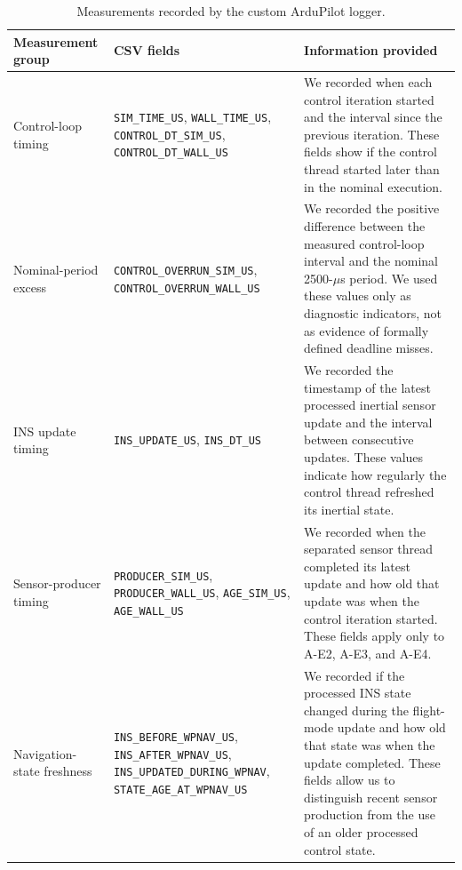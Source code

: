 \begin{table}[t]
    \centering
    \caption{Measurements recorded by the custom ArduPilot logger.}
    \label{tab:ardupilot-measurements}
    \footnotesize
    \begin{tabular}{
        p{}
        p{}
        p{}}
        \toprule
        Measurement group &
        CSV fields &
        Information provided \\
        \midrule

        Control-loop timing &
        \texttt{SIM\_TIME\_US},
        \texttt{WALL\_TIME\_US},
        \texttt{CONTROL\_DT\_SIM\_US},
        \texttt{CONTROL\_DT\_WALL\_US} &
        We recorded when each control iteration started and the
        interval since the previous iteration. These fields show
        if the control thread started later than in the nominal
        execution. \\

        Nominal-period excess &
        \texttt{CONTROL\_OVERRUN\_SIM\_US},
        \texttt{CONTROL\_OVERRUN\_WALL\_US} &
        We recorded the positive difference between the measured
        control-loop interval and the nominal 2500-$\mu$s period.
        We used these values only as diagnostic indicators, not as
        evidence of formally defined deadline misses. \\

        INS update timing &
        \texttt{INS\_UPDATE\_US},
        \texttt{INS\_DT\_US} &
        We recorded the timestamp of the latest processed inertial
        sensor update and the interval between consecutive updates.
        These values indicate how regularly the control thread
        refreshed its inertial state. \\

        Sensor-producer timing &
        \texttt{PRODUCER\_SIM\_US},
        \texttt{PRODUCER\_WALL\_US},
        \texttt{AGE\_SIM\_US},
        \texttt{AGE\_WALL\_US} &
        We recorded when the separated sensor thread completed its
        latest update and how old that update was when the control
        iteration started. These fields apply only to A-E2, A-E3,
        and A-E4. \\

        Navigation-state freshness &
        \texttt{INS\_BEFORE\_WPNAV\_US},
        \texttt{INS\_AFTER\_WPNAV\_US},
        \texttt{INS\_UPDATED\_DURING\_WPNAV},
        \texttt{STATE\_AGE\_AT\_WPNAV\_US} &
        We recorded if the processed INS state changed during
        the flight-mode update and how old that state was when the
        update completed. These fields allow us to distinguish recent
        sensor production from the use of an older processed control
        state. \\


\end{tabular}
\end{table}
